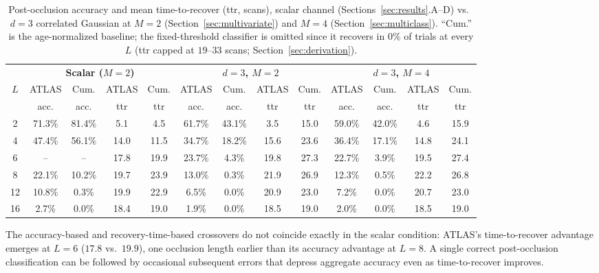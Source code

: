 \documentclass[conference]{IEEEtran}
\begin{document}
\begin{table}[t]
\caption{Post-occlusion accuracy and mean time-to-recover (ttr, scans), scalar channel (Sections~\ref{sec:results}.A--D) vs.\ $d=3$ correlated Gaussian at $M=2$ (Section~\ref{sec:multivariate}) and $M=4$ (Section~\ref{sec:multiclass}). ``Cum.'' is the age-normalized baseline; the fixed-threshold classifier is omitted since it recovers in $0\%$ of trials at every $L$ (ttr capped at $19$--$33$ scans; Section~\ref{sec:derivation}).}
\label{tab:ttr_combined}
\centering
\begin{tabular}{c cc cc cc cc cc cc}
\toprule
& \multicolumn{4}{c}{\textbf{Scalar ($M=2$)}} & \multicolumn{4}{c}{\textbf{$d{=}3$, $M{=}2$}} & \multicolumn{4}{c}{\textbf{$d{=}3$, $M{=}4$}} \\
\cmidrule(lr){2-5} \cmidrule(lr){6-9} \cmidrule(lr){10-13}
$L$ & ATLAS & Cum. & ATLAS & Cum. & ATLAS & Cum. & ATLAS & Cum. & ATLAS & Cum. & ATLAS & Cum. \\
 & acc. & acc. & ttr & ttr & acc. & acc. & ttr & ttr & acc. & acc. & ttr & ttr \\
\midrule
2  & 71.3\% & 81.4\% & 5.1  & 4.5  & 61.7\% & 43.1\% & 3.5  & 15.0 & 59.0\% & 42.0\% & 4.6  & 15.9 \\
4  & 47.4\% & 56.1\% & 14.0 & 11.5 & 34.7\% & 18.2\% & 15.6 & 23.6 & 36.4\% & 17.1\% & 14.8 & 24.1 \\
6  & --     & --     & 17.8 & 19.9 & 23.7\% & 4.3\%  & 19.8 & 27.3 & 22.7\% & 3.9\%  & 19.5 & 27.4 \\
8  & 22.1\% & 10.2\% & 19.7 & 23.9 & 13.0\% & 0.3\%  & 21.9 & 26.9 & 12.3\% & 0.5\%  & 22.2 & 26.8 \\
12 & 10.8\% & 0.3\%  & 19.9 & 22.9 & 6.5\%  & 0.0\%  & 20.9 & 23.0 & 7.2\%  & 0.0\%  & 20.7 & 23.0 \\
16 & 2.7\%  & 0.0\%  & 18.4 & 19.0 & 1.9\%  & 0.0\%  & 18.5 & 19.0 & 2.0\%  & 0.0\%  & 18.5 & 19.0 \\
\bottomrule
\end{tabular}
\end{table}

The accuracy-based and recovery-time-based crossovers do not coincide exactly in the scalar condition: ATLAS's time-to-recover advantage emerges at $L=6$ ($17.8$ vs.\ $19.9$), one occlusion length earlier than its accuracy advantage at $L=8$. A single correct post-occlusion classification can be followed by occasional subsequent errors that depress aggregate accuracy even as time-to-recover improves.
\end{document}
